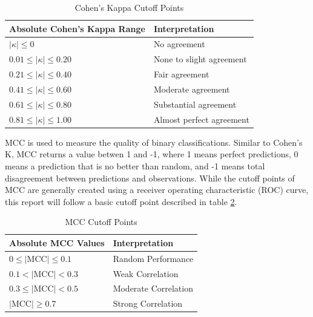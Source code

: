 \documentclass[10.7pt, twocolumn]{article}
\begin{document}
\begin{table}[H]
  \centering
  \begin{tabular}{|p{4cm}|p{3cm}|}
    \hline
    \textbf{Absolute Cohen's Kappa Range} & \textbf{Interpretation} \\
    \hline
    $|\kappa| \leq 0$ & No agreement \\
    \hline
    $0.01 \leq |\kappa| \leq 0.20$ & None to slight agreement \\
    \hline
    $0.21 \leq |\kappa| \leq 0.40$ & Fair agreement \\
    \hline
    $0.41 \leq |\kappa| \leq 0.60$ & Moderate agreement \\
    \hline
    $0.61 \leq |\kappa| \leq 0.80$ & Substantial agreement \\
    \hline
    $0.81 \leq |\kappa| \leq 1.00$ & Almost perfect agreement \\
    \hline
  \end{tabular}
  \caption{Cohen's Kappa Cutoff Points}
  \label{tab:kappaInterpretation}
\end{table}

MCC is used to measure the quality of binary classifications\cite{mcc}. Similar to Cohen's K, MCC returns a value betwen 1 and -1, where 1 means perfect predictions, 0 means a prediction that is no better than random, and -1 means total disagreement between predictions and observations. While the cutoff points of MCC are generally created using a receiver operating characteristic (ROC) curve, this report will follow a basic cutoff point described in table \ref{tab:mccInterpretation}.

\begin{table}[H]
  \centering
  \begin{tabular}{|p{4cm}|p{3cm}|}
    \hline
    \textbf{Absolute MCC Values} & \textbf{Interpretation} \\
    \hline
    $0 \leq |\text{MCC}| \leq 0.1$ & Random Performance \\
    \hline
    $0.1 < |\text{MCC}| < 0.3$ & Weak Correlation \\
    \hline
    $0.3 \leq |\text{MCC}| < 0.5$ & Moderate Correlation \\
    \hline
    $|\text{MCC}| \geq 0.7$ & Strong Correlation \\
    \hline
  \end{tabular}
  \caption{MCC Cutoff Points}
  \label{tab:mccInterpretation}
\end{table}
\end{document}
